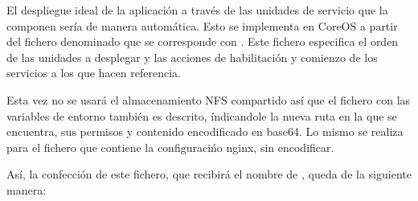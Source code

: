 El despliegue ideal de la aplicación a través de las unidades de servicio que la componen sería de manera automática. Esto se implementa en CoreOS a partir del fichero denominado  que se corresponde con . Este fichero especifica el orden de las unidades a desplegar y las acciones de habilitación y comienzo de los servicios a los que hacen referencia.

Esta vez no se usará el almacenamiento NFS compartido así que el fichero con las variables de entorno también es descrito, índicandole la nueva ruta en la que se encuentra, sus permisos y contenido encodificado en base64. Lo mismo se realiza para el fichero que contiene la configuracińo nginx, sin encodificar.

Así, la confección de este fichero, que recibirá el nombre de , queda de la siguiente manera:

